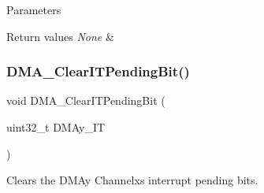 \begin{DoxyParams}{Parameters}
\\
\hline
\end{DoxyParams}

\begin{DoxyRetVals}{Return values}
{\em None} & \\
\hline
\end{DoxyRetVals}
\mbox{\label{group___d_m_a___private___functions_ga91a7340e5b334a942f3eb1e05ed5f67a}} 
\subsubsection{\texorpdfstring{DMA\_ClearITPendingBit()}{DMA\_ClearITPendingBit()}}
{\footnotesize\ttfamily void D\+M\+A\+\_\+\+Clear\+I\+T\+Pending\+Bit (\begin{DoxyParamCaption}\item[{uint32\+\_\+t}]{D\+M\+Ay\+\_\+\+IT }\end{DoxyParamCaption})}



Clears the D\+M\+Ay Channelx\textquotesingle{}s interrupt pending bits. 


